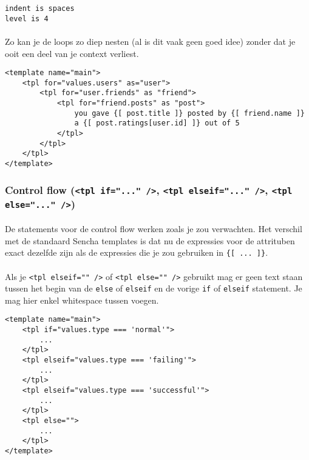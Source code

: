 \begin{lstlisting}
indent is spaces
level is 4
\end{lstlisting}

\paragraph {} Zo kan je de loops zo diep nesten (al is dit vaak geen goed idee) zonder dat
je ooit een deel van je context verliest.

\begin{lstlisting}
<template name="main">
	<tpl for="values.users" as="user">
		<tpl for="user.friends" as "friend">
			<tpl for="friend.posts" as "post">
				you gave {[ post.title ]} posted by {[ friend.name ]}
				a {[ post.ratings[user.id] ]} out of 5
			</tpl>
		</tpl>
	</tpl>
</template>
\end{lstlisting}


\subsubsection {Control flow (\lstinline{<tpl if="..." />},
	\lstinline{<tpl elseif="..." />}, \lstinline{<tpl else="..." />})}

\paragraph {} De statements voor de control flow werken zoals je zou verwachten. Het
verschil met de standaard Sencha templates is dat nu de expressies voor de attrituben
exact dezelfde zijn als de expressies die je zou gebruiken in \lstinline|{[ ... ]}|.

\paragraph {}Als je \lstinline{<tpl elseif="" />} of \lstinline{<tpl else="" />} gebruikt
mag er geen text staan tussen het begin van de \lstinline{else} of \lstinline{elseif} en
de vorige \lstinline{if} of \lstinline{elseif} statement. Je mag hier enkel whitespace
tussen voegen.

\begin{lstlisting}
<template name="main">
	<tpl if="values.type === 'normal'">
		...
	</tpl>
	<tpl elseif="values.type === 'failing'">
		...
	</tpl>
	<tpl elseif="values.type === 'successful'">
		...
	</tpl>
	<tpl else="">
		...
	</tpl>
</template>
\end{lstlisting}

